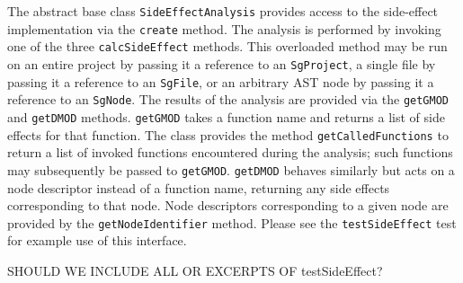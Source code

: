 \documentclass[times, 10pt]{article}
\begin{document}
The abstract base class {\tt SideEffectAnalysis} provides access to
the side-effect implementation via the {\tt create} method.  The
analysis is performed by invoking one of the three {\tt calcSideEffect}
methods.  This overloaded method may be run on an entire project by
passing it a reference to an {\tt SgProject}, a single file by
passing it a reference to an {\tt SgFile}, or an arbitrary AST
node by passing it a reference to an {\tt SgNode}.  The results of
the analysis are provided via the {\tt getGMOD} and {\tt getDMOD} methods.
{\tt getGMOD} takes a function name and returns a list of side effects
for that function.  The class provides the method {\tt getCalledFunctions}
to return a list of invoked functions encountered during the analysis;
such functions may subsequently be passed to {\tt getGMOD}.  {\tt getDMOD}
behaves similarly but acts on a node descriptor instead of a
function name, returning any side effects corresponding to that node.
Node descriptors corresponding to a given node are provided by
the {\tt getNodeIdentifier} method.  Please see the {\tt testSideEffect}
test for example use of this interface.

SHOULD WE INCLUDE ALL OR EXCERPTS OF testSideEffect?




\end{document}
